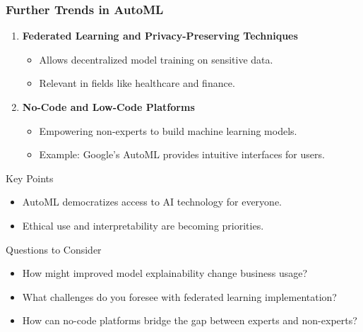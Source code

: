 \documentclass[aspectratio=169]{beamer}
\begin{document}
\begin{frame}[fragile]
  \frametitle{Further Trends in AutoML}
  \begin{enumerate}[resume]
    \item \textbf{Federated Learning and Privacy-Preserving Techniques}
      \begin{itemize}
        \item Allows decentralized model training on sensitive data.
        \item Relevant in fields like healthcare and finance.
      \end{itemize}
    
    \item \textbf{No-Code and Low-Code Platforms}
      \begin{itemize}
        \item Empowering non-experts to build machine learning models.
        \item Example: Google’s AutoML provides intuitive interfaces for users.
      \end{itemize}
  \end{enumerate}
  
  \begin{block}{Key Points}
    \begin{itemize}
      \item AutoML democratizes access to AI technology for everyone.
      \item Ethical use and interpretability are becoming priorities.
    \end{itemize}
  \end{block}
  
  \begin{block}{Questions to Consider}
    \begin{itemize}
      \item How might improved model explainability change business usage?
      \item What challenges do you foresee with federated learning implementation?
      \item How can no-code platforms bridge the gap between experts and non-experts?
    \end{itemize}
  \end{block}
\end{frame}
\end{document}
